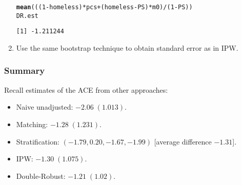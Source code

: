 \documentclass[oneside]{book}\usepackage[]{graphicx}\usepackage[svgnames]{xcolor}
\makeatletter
\newcommand{\hlnum}[1]{\textcolor[rgb]{0.686,0.059,0.569}{#1}}%
\newcommand{\hlopt}[1]{\textcolor[rgb]{0,0,0}{#1}}%
\newcommand{\hlstd}[1]{\textcolor[rgb]{0.345,0.345,0.345}{#1}}%
\newcommand{\hlkwd}[1]{\textcolor[rgb]{0.737,0.353,0.396}{\textbf{#1}}}%
\newenvironment{kframe}{%
 \def\at@end@of@kframe{}%
 \ifinner\ifhmode%
  \def\at@end@of@kframe{\end{minipage}}%
  \begin{minipage}{\columnwidth}%
 \fi\fi%
 \def\FrameCommand##1{\hskip\@totalleftmargin \hskip-\fboxsep
 \colorbox{shadecolor}{##1}\hskip-\fboxsep
     \hskip-\linewidth \hskip-\@totalleftmargin \hskip\columnwidth}%
 \MakeFramed {\advance\hsize-\width
   \@totalleftmargin\z@ \linewidth\hsize
   \@setminipage}}%
 {\par\unskip\endMakeFramed%
 \at@end@of@kframe}
\newenvironment{knitrout}{}{} %
\makeatother
\begin{document}
\begin{enumerate}[1.]
\begin{knitrout}
\begin{kframe}
\begin{alltt}
  \hlkwd{mean}\hlstd{(((}\hlnum{1} \hlopt{-} \hlstd{homeless)} \hlopt{*} \hlstd{pcs} \hlopt{+} \hlstd{(homeless} \hlopt{-} \hlstd{PS)} \hlopt{*} \hlstd{m0)}\hlopt{/}\hlstd{(}\hlnum{1} \hlopt{-} \hlstd{PS))}
\hlstd{DR.est}
\end{alltt}
\begin{verbatim}
[1] -1.211244
\end{verbatim}
\end{kframe}
\end{knitrout}
      \item Use the same bootstrap technique to obtain standard error as in
            IPW\@.
\end{enumerate}
\subsubsection{Summary}
Recall estimates of the ACE from other approaches:
\begin{itemize}
      \item Naive unadjusted: $ -2.06\;(1.013) $.
      \item Matching: $ -1.28\;(1.231) $.
      \item Stratification: $ (-1.79,0.20,-1.67,-1.99) $ [average difference $ -1.31 $].
      \item IPW\@: $ -1.30\;(1.075) $.
      \item Double-Robust: $ -1.21\;(1.02) $.
\end{itemize}
\end{document}

